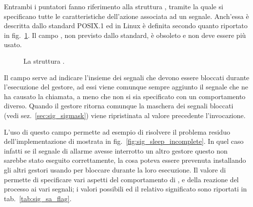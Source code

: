 Entrambi i puntatori fanno riferimento alla struttura ,
tramite la quale si specificano tutte le caratteristiche dell'azione associata
ad un segnale.  Anch'essa è descritta dallo standard POSIX.1 ed in Linux è
definita secondo quanto riportato in fig.~\ref{fig:sig_sigaction}. Il campo
, non previsto dallo standard, è obsoleto e non deve essere
più usato.

\begin{figure}[!htb]
  \footnotesize \centering
  \begin{minipage}[c]{0.8\textwidth}
  \end{minipage} 
  \normalsize 
  \caption{La struttura .} 
  \label{fig:sig_sigaction}
\end{figure}

Il campo  serve ad indicare l'insieme dei segnali che devono
essere bloccati durante l'esecuzione del gestore, ad essi viene comunque
sempre aggiunto il segnale che ne ha causato la chiamata, a meno che non si
sia specificato con  un comportamento diverso. Quando il
gestore ritorna comunque la maschera dei segnali bloccati (vedi
sez.~\ref{sec:sig_sigmask}) viene ripristinata al valore precedente
l'invocazione.

L'uso di questo campo permette ad esempio di risolvere il problema residuo
dell'implementazione di  mostrata in
fig.~\ref{fig:sig_sleep_incomplete}. In quel caso infatti se il segnale di
allarme avesse interrotto un altro gestore questo non sarebbe stato eseguito
correttamente, la cosa poteva essere prevenuta installando gli altri gestori
usando  per bloccare  durante la loro
esecuzione.  Il valore di  permette di specificare vari aspetti
del comportamento di , e della reazione del processo ai vari
segnali; i valori possibili ed il relativo significato sono riportati in
tab.~\ref{tab:sig_sa_flag}.

